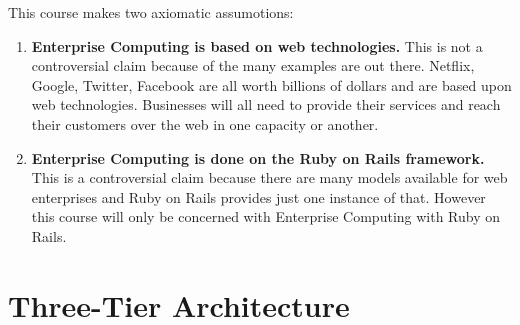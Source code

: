 \documentclass[11pt]{article}
\begin{document}
This course makes two axiomatic assumotions:

\begin{enumerate}
\item \textbf{Enterprise Computing is based on web technologies.} This is not a controversial claim because of the many examples are out there. Netflix, Google, Twitter, Facebook are all worth billions of dollars and are based upon web technologies. Businesses will all need to provide their services and reach their customers over the web in one capacity or another.
\item \textbf{Enterprise Computing is done on the Ruby on Rails framework.} This is a controversial claim because there are many models available for web enterprises and Ruby on Rails provides just one instance of that. However this course will only be concerned with Enterprise Computing with Ruby on Rails.
\end{enumerate}



\section{Three-Tier Architecture}
\label{sec:tier}
\end{document}
